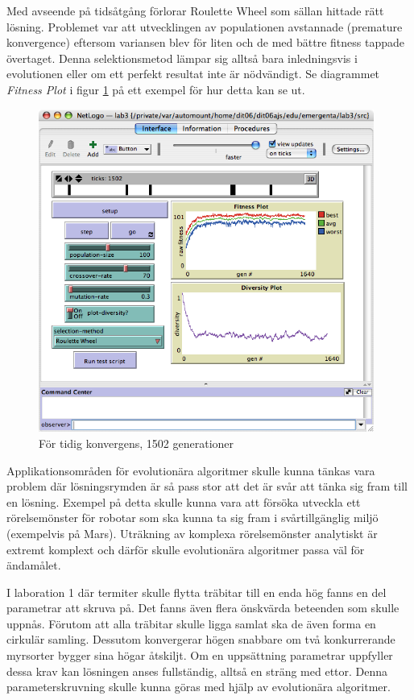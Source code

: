 \documentclass[titlepage, a4paper, 12pt]{article}
\begin{document}
Med avseende på tidsåtgång förlorar Roulette Wheel som sällan hittade
rätt lösning. Problemet var att utvecklingen av populationen
avstannade (premature konvergence) eftersom variansen blev för liten
och de med bättre fitness tappade övertaget. Denna selektionsmetod
lämpar sig alltså bara inledningsvis i evolutionen eller om ett
perfekt resultat inte är nödvändigt. Se diagrammet \textit{Fitness Plot} i
figur \ref{fig:images/premature-convergence} på ett exempel för hur
detta kan se ut.

\begin{figure}[H]
  \begin{center}
    \includegraphics[width=110mm]{images/premature-convergence.png}
    \caption{För tidig konvergens, 1502 generationer}
    \label{fig:images/premature-convergence}
  \end{center}
\end{figure}

Applikationsområden för evolutionära algoritmer skulle kunna tänkas
vara problem där lösningsrymden är så pass stor att det är svår att
tänka sig fram till en lösning. Exempel på detta skulle kunna vara att
försöka utveckla ett rörelsemönster för robotar som ska kunna ta sig
fram i svårtillgänglig miljö (exempelvis på Mars). Uträkning av
komplexa rörelsemönster analytiskt är extremt komplext och därför
skulle evolutionära algoritmer passa väl för ändamålet.

I laboration 1 där termiter skulle flytta träbitar till en enda hög
fanns en del parametrar att skruva på. Det fanns även flera önskvärda
beteenden som skulle uppnås. Förutom att alla träbitar skulle ligga
samlat ska de även forma en cirkulär samling. Dessutom konvergerar
högen snabbare om två konkurrerande myrsorter bygger sina högar
åtskiljt. Om en uppsättning parametrar uppfyller dessa krav kan
lösningen anses fullständig, alltså en sträng med ettor. Denna
parameterskruvning skulle kunna göras med hjälp av evolutionära
algoritmer.
\end{document}
